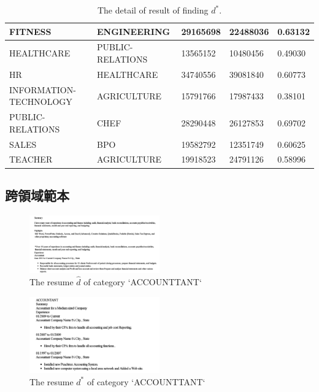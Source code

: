 \documentclass[acmsmall]{acmart}
\begin{document}
\begin{table}[t]
{\begin{tabular}{|l|l|l|l|l|}
FITNESS                & ENGINEERING            & 29165698   & 22488036    & 0.63132 \\ \hline
HEALTHCARE             & PUBLIC-RELATIONS       & 13565152   & 10480456    & 0.49030 \\ \hline
HR                     & HEALTHCARE             & 34740556   & 39081840    & 0.60773 \\ \hline
INFORMATION-TECHNOLOGY & AGRICULTURE            & 15791766   & 17987433    & 0.38101 \\ \hline
PUBLIC-RELATIONS       & CHEF                   & 28290448   & 26127853    & 0.69702 \\ \hline
SALES                  & BPO                    & 19582792   & 12351749    & 0.60625 \\ \hline
TEACHER                & AGRICULTURE            & 19918523   & 24791126    & 0.58996 \\ \hline
\end{tabular}%
}
\caption{The detail of result of finding $d^{*}$.}
\label{table:1}
\end{table}


\subsection{跨領域範本}

\begin{figure}[t]
    \centerline{\includegraphics[width=0.5\textwidth]{resume_d_hat.png}}
    \caption{The resume $\hat{d}$ of category `ACCOUNTTANT`}
    \label{resume_d_hat}
\end{figure}

\begin{figure}[t]
    \centerline{\includegraphics[width=0.5\textwidth]{resume_d_star.png}}
    \caption{The resume $d^{*}$ of category `ACCOUNTTANT`}
    \label{resume_d_star}
\end{figure}
\end{document}
